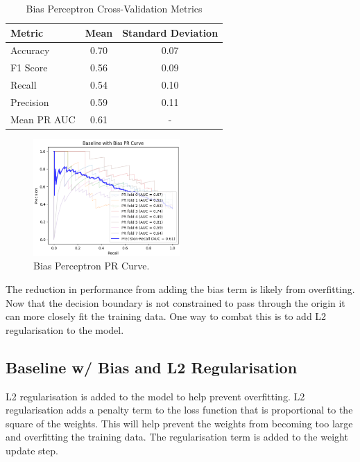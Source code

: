 \begin{table}[ht!]
    \centering
    \begin{tabular}{lcc}
        \toprule
        \textbf{Metric} & \textbf{Mean} & \textbf{Standard Deviation} \\
        \midrule
        Accuracy & 0.70 & 0.07 \\
        F1 Score & 0.56 & 0.09 \\
        Recall & 0.54 & 0.10 \\
        Precision & 0.59 & 0.11 \\
        Mean PR AUC & 0.61 & - \\
        \bottomrule
    \end{tabular}
    \caption{Bias Perceptron Cross-Validation Metrics}
    \label{tab:bias_metrics}
\end{table}

\begin{figure}[ht!]
    \centering
    \includegraphics[width=0.5\textwidth]{images/bias_pr.png}
    \caption{Bias Perceptron PR Curve.}
    \label{fig:bias_pr}
\end{figure}

The reduction in performance from adding the bias term is likely from overfitting. Now that the decision boundary is not constrained to pass through the origin it can more closely fit the training data. One way to combat this is to add L2 regularisation to the model. 
  

\subsection{Baseline w/ Bias and L2 Regularisation}

L2 regularisation is added to the model to help prevent overfitting. L2 regularisation adds a penalty term to the loss function that is proportional to the square of the weights. This will help prevent the weights from becoming too large and overfitting the training data. The regularisation term is added to the weight update step.

